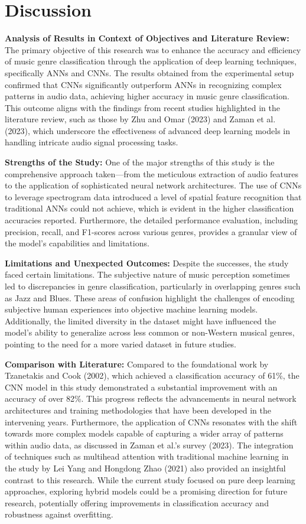 \documentclass[lettersize,journal]{IEEEtran}
\begin{document}
\section{Discussion}
\textbf{Analysis of Results in Context of Objectives and Literature Review:} The primary objective of this research was to enhance the accuracy and efficiency of music genre classification through the application of deep learning techniques, specifically ANNs and CNNs. The results obtained from the experimental setup confirmed that CNNs significantly outperform ANNs in recognizing complex patterns in audio data, achieving higher accuracy in music genre classification. This outcome aligns with the findings from recent studies highlighted in the literature review, such as those by Zhu and Omar (2023) and Zaman et al. (2023), which underscore the effectiveness of advanced deep learning models in handling intricate audio signal processing tasks.

\textbf{Strengths of the Study:} One of the major strengths of this study is the comprehensive approach taken—from the meticulous extraction of audio features to the application of sophisticated neural network architectures. The use of CNNs to leverage spectrogram data introduced a level of spatial feature recognition that traditional ANNs could not achieve, which is evident in the higher classification accuracies reported. Furthermore, the detailed performance evaluation, including precision, recall, and F1-scores across various genres, provides a granular view of the model’s capabilities and limitations.

\textbf{Limitations and Unexpected Outcomes:} Despite the successes, the study faced certain limitations. The subjective nature of music perception sometimes led to discrepancies in genre classification, particularly in overlapping genres such as Jazz and Blues. These areas of confusion highlight the challenges of encoding subjective human experiences into objective machine learning models. Additionally, the limited diversity in the dataset might have influenced the model’s ability to generalize across less common or non-Western musical genres, pointing to the need for a more varied dataset in future studies.

\textbf{Comparison with Literature:} Compared to the foundational work by Tzanetakis and Cook (2002), which achieved a classification accuracy of 61\%, the CNN model in this study demonstrated a substantial improvement with an accuracy of over 82\%. This progress reflects the advancements in neural network architectures and training methodologies that have been developed in the intervening years. Furthermore, the application of CNNs resonates with the shift towards more complex models capable of capturing a wider array of patterns within audio data, as discussed in Zaman et al.’s survey (2023). The integration of techniques such as multihead attention with traditional machine learning in the study by Lei Yang and Hongdong Zhao (2021) also provided an insightful contrast to this research. While the current study focused on pure deep learning approaches, exploring hybrid models could be a promising direction for future research, potentially offering improvements in classification accuracy and robustness against overfitting.
\end{document}
